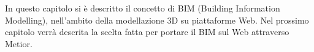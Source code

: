 In questo capitolo si è descritto il concetto di BIM (Building Information Modelling),
nell'ambito della modellazione 3D su piattaforme Web. Nel prossimo
capitolo verrà descrita la scelta fatta per portare il BIM sul Web attraverso Metior.
